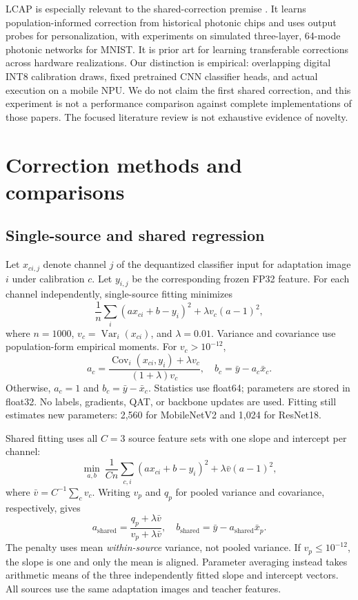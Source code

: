 \documentclass[10pt,twocolumn]{article}
\newcommand{\Var}{\operatorname{Var}}
\newcommand{\Cov}{\operatorname{Cov}}
\begin{document}
LCAP is especially relevant to the shared-correction premise \citep{gao2026lcap}. It learns population-informed correction from historical photonic chips and uses output probes for personalization, with experiments on simulated three-layer, 64-mode photonic networks for MNIST. It is prior art for learning transferable corrections across hardware realizations. Our distinction is empirical: overlapping digital INT8 calibration draws, fixed pretrained CNN classifier heads, and actual execution on a mobile NPU. We do not claim the first shared correction, and this experiment is not a performance comparison against complete implementations of those papers. The focused literature review is not exhaustive evidence of novelty.

\section{Correction methods and comparisons}
\subsection{Single-source and shared regression}
Let $x_{ci,j}$ denote channel $j$ of the dequantized classifier input for adaptation image $i$ under calibration $c$. Let $y_{i,j}$ be the corresponding frozen FP32 feature. For each channel independently, single-source fitting minimizes
\begin{equation}
 \frac{1}{n}\sum_i(ax_{ci}+b-y_i)^2+\lambda v_c(a-1)^2,
 \label{eq:single}
\end{equation}
where $n=1000$, $v_c=\Var_i(x_{ci})$, and $\lambda=0.01$. Variance and covariance use population-form empirical moments. For $v_c>10^{-12}$,
\begin{equation}
 a_c=\frac{\Cov_i(x_{ci},y_i)+\lambda v_c}{(1+\lambda)v_c},
 \quad b_c=\bar y-a_c\bar x_c.
\end{equation}
Otherwise, $a_c=1$ and $b_c=\bar y-\bar x_c$. Statistics use float64; parameters are stored in float32. No labels, gradients, QAT, or backbone updates are used. Fitting still estimates new parameters: 2,560 for MobileNetV2 and 1,024 for ResNet18.

Shared fitting uses all $C=3$ source feature sets with one slope and intercept per channel:
\begin{equation}
 \min_{a,b}\ \frac{1}{Cn}\sum_{c,i}(ax_{ci}+b-y_i)^2
 +\lambda\bar v(a-1)^2,
 \label{eq:shared}
\end{equation}
where $\bar v=C^{-1}\sum_c v_c$. Writing $v_p$ and $q_p$ for pooled variance and covariance, respectively, gives
\begin{equation}
 a_{\mathrm{shared}}=\frac{q_p+\lambda\bar v}{v_p+\lambda\bar v},
 \quad b_{\mathrm{shared}}=\bar y-a_{\mathrm{shared}}\bar x_p.
 \label{eq:sharedsolution}
\end{equation}
The penalty uses mean \emph{within-source} variance, not pooled variance. If $v_p\leq10^{-12}$, the slope is one and only the mean is aligned. Parameter averaging instead takes arithmetic means of the three independently fitted slope and intercept vectors. All sources use the same adaptation images and teacher features.
\end{document}
